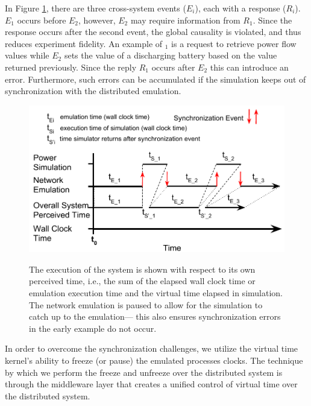 In Figure \ref{sim-err}, there are three cross-system events ($E_i$), each
with a response ($R_i$). $E_1$ occurs before $E_2$, however, $E_2$ may
require information from $R_1$. Since the response occurs after
the second event, the global causality is violated, and thus
reduces experiment fidelity. An example of $_1$ is a request
to retrieve power flow values while $E_2$ sets the value of a
discharging battery based on the value returned previously.
Since the reply $R_1$ occurs after $E_2$ this can introduce an
error. Furthermore, such errors can be accumulated if the
simulation keeps out of synchronization with the distributed emulation.

\begin{figure}
  \centering
  \includegraphics[scale=0.5]{wall_clock.pdf}
  \label{sim-err}

  \caption{
    The execution of the system is shown with respect
    to its own perceived time, i.e., the sum of the elapsed wall clock time or emulation
    execution time and the virtual time elapsed in simulation. The network emulation is paused
    to allow for the simulation to catch up to the emulation—
    this also ensures synchronization errors in the early example
    do not occur.
  }
\end{figure}

In order to overcome the synchronization challenges, we utilize the virtual time kernel's ability to freeze (or pause) the emulated processes clocks. The technique by which we perform the freeze and unfreeze over the distributed system is through the middleware layer that creates a unified control of virtual time over the distributed system.


